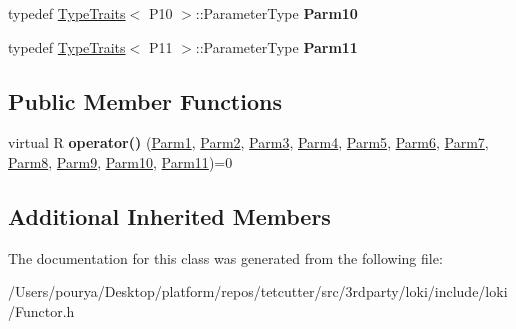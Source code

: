 \begin{DoxyCompactItemize}
\item 
\hypertarget{classLoki_1_1FunctorImpl_3_01R_00_01_01_01_01_01_01_01_01_01_01_01_01_01_01_01_01_01_01_01_01_012cc17e10e293e3d42873c3bf9f251a40_a5789f8e3247bf414db77c3e818b04fc8}{}typedef \hyperlink{classLoki_1_1TypeTraits}{Type\+Traits}$<$ P10 $>$\+::Parameter\+Type {\bfseries Parm10}\label{classLoki_1_1FunctorImpl_3_01R_00_01_01_01_01_01_01_01_01_01_01_01_01_01_01_01_01_01_01_01_01_012cc17e10e293e3d42873c3bf9f251a40_a5789f8e3247bf414db77c3e818b04fc8}

\item 
\hypertarget{classLoki_1_1FunctorImpl_3_01R_00_01_01_01_01_01_01_01_01_01_01_01_01_01_01_01_01_01_01_01_01_012cc17e10e293e3d42873c3bf9f251a40_a6acee0c2f849b5f99ada4408e150bfed}{}typedef \hyperlink{classLoki_1_1TypeTraits}{Type\+Traits}$<$ P11 $>$\+::Parameter\+Type {\bfseries Parm11}\label{classLoki_1_1FunctorImpl_3_01R_00_01_01_01_01_01_01_01_01_01_01_01_01_01_01_01_01_01_01_01_01_012cc17e10e293e3d42873c3bf9f251a40_a6acee0c2f849b5f99ada4408e150bfed}

\end{DoxyCompactItemize}
\subsection*{Public Member Functions}
\begin{DoxyCompactItemize}
\item 
\hypertarget{classLoki_1_1FunctorImpl_3_01R_00_01_01_01_01_01_01_01_01_01_01_01_01_01_01_01_01_01_01_01_01_012cc17e10e293e3d42873c3bf9f251a40_a802ea4f01adf68dbc49ac9e89717f9f8}{}virtual R {\bfseries operator()} (\hyperlink{classLoki_1_1EmptyType}{Parm1}, \hyperlink{classLoki_1_1EmptyType}{Parm2}, \hyperlink{classLoki_1_1EmptyType}{Parm3}, \hyperlink{classLoki_1_1EmptyType}{Parm4}, \hyperlink{classLoki_1_1EmptyType}{Parm5}, \hyperlink{classLoki_1_1EmptyType}{Parm6}, \hyperlink{classLoki_1_1EmptyType}{Parm7}, \hyperlink{classLoki_1_1EmptyType}{Parm8}, \hyperlink{classLoki_1_1EmptyType}{Parm9}, \hyperlink{classLoki_1_1EmptyType}{Parm10}, \hyperlink{classLoki_1_1EmptyType}{Parm11})=0\label{classLoki_1_1FunctorImpl_3_01R_00_01_01_01_01_01_01_01_01_01_01_01_01_01_01_01_01_01_01_01_01_012cc17e10e293e3d42873c3bf9f251a40_a802ea4f01adf68dbc49ac9e89717f9f8}

\end{DoxyCompactItemize}
\subsection*{Additional Inherited Members}


The documentation for this class was generated from the following file\+:\begin{DoxyCompactItemize}
\item 
/\+Users/pourya/\+Desktop/platform/repos/tetcutter/src/3rdparty/loki/include/loki/Functor.\+h\end{DoxyCompactItemize}
